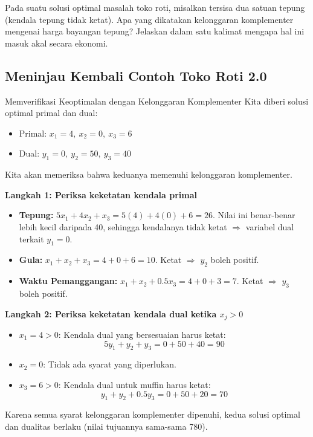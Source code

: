 \begin{learningcheckpoint}[label={lc:cs-leftover}]
Pada suatu solusi optimal masalah toko roti, misalkan tersisa dua satuan tepung (kendala tepung tidak ketat). Apa yang dikatakan kelonggaran komplementer mengenai harga bayangan tepung? Jelaskan dalam satu kalimat mengapa hal ini masuk akal secara ekonomi.
\end{learningcheckpoint}

\subsection*{Meninjau Kembali Contoh Toko Roti 2.0}

\begin{example}{Memverifikasi Keoptimalan dengan Kelonggaran Komplementer}\label{example:cs-bakery2-verify}
Kita diberi solusi optimal primal dan dual:

\begin{itemize}
\item Primal: \( x_1 = 4,\ x_2 = 0,\ x_3 = 6 \)
\item Dual: \( y_1 = 0,\ y_2 = 50,\ y_3 = 40 \)
\end{itemize}

Kita akan memeriksa bahwa keduanya memenuhi kelonggaran komplementer.

\textbf{Langkah 1: Periksa keketatan kendala primal}

\begin{itemize}
\item \textbf{Tepung: } \( 5x_1 + 4x_2 + x_3 = 5(4) + 4(0) + 6 = 26 \). Nilai ini benar-benar lebih kecil daripada 40, sehingga kendalanya tidak ketat \(\Rightarrow\) variabel dual terkait \(y_1 = 0\).
\item \textbf{Gula: } \( x_1 + x_2 + x_3 = 4 + 0 + 6 = 10 \). Ketat \(\Rightarrow\) \(y_2\) boleh positif.
\item \textbf{Waktu Pemanggangan: } \( x_1 + x_2 + 0.5x_3 = 4 + 0 + 3 = 7 \). Ketat \(\Rightarrow\) \(y_3\) boleh positif.
\end{itemize}

\textbf{Langkah 2: Periksa keketatan kendala dual ketika \(x_j > 0\)}

\begin{itemize}
\item \(x_1 = 4 > 0\): Kendala dual yang bersesuaian harus ketat:
\[
5y_1 + y_2 + y_3 = 0 + 50 + 40 = 90
\]
\item \(x_2 = 0\): Tidak ada syarat yang diperlukan.
\item \(x_3 = 6 > 0\): Kendala dual untuk muffin harus ketat:
\[
y_1 + y_2 + 0.5y_3 = 0 + 50 + 20 = 70
\]
\end{itemize}

Karena semua syarat kelonggaran komplementer dipenuhi, kedua solusi optimal dan dualitas berlaku (nilai tujuannya sama-sama 780).
\end{example}

